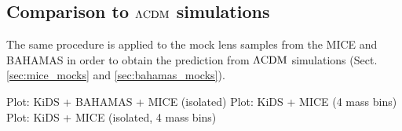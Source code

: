 \documentclass[usenatbib]{mnras}
\newcommand{\lcdm}{{\rm \Lambda CDM}}
\begin{document}
\subsection{Comparison to $\lcdm$ simulations}

The same procedure is applied to the mock lens samples from the MICE and BAHAMAS in order to obtain the prediction from $\lcdm$ simulations (Sect. \ref{sec:mice_mocks} and \ref{sec:bahamas_mocks}).

Plot: KiDS + BAHAMAS + MICE (isolated)
Plot: KiDS + MICE (4 mass bins)
Plot: KiDS + MICE (isolated, 4 mass bins)

\end{document}
